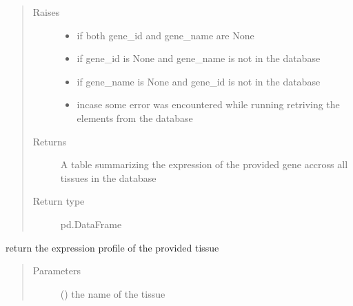 \documentclass[letterpaper,10pt,english]{sphinxmanual}
\begin{document}
\begin{fulllineitems}
\begin{fulllineitems}
\begin{quote}
\begin{description}
\begin{itemize}
\end{itemize}

\item[{Raises}] \leavevmode\begin{itemize}
\item {} 
 \textendash{} if both gene\_id and gene\_name are None

\item {} 
 \textendash{} if gene\_id is None and gene\_name is not in the database

\item {} 
 \textendash{} if gene\_name is None and gene\_id is not in the database

\item {} 
 \textendash{} incase some error was encountered while running retriving the elements from the database

\end{itemize}

\item[{Returns}] \leavevmode
A table summarizing the expression of the provided gene accross all tissues in the database

\item[{Return type}] \leavevmode
pd.DataFrame

\end{description}\end{quote}

\end{fulllineitems}


\begin{fulllineitems}
\label{\detokenize{IPTK.Classes:IPTK.Classes.Database.GeneExpressionDB.get_expression_in_tissue}}
return the expression profile of the provided tissue
\begin{quote}\begin{description}
\item[{Parameters}] \leavevmode
{} () \textendash{} the name of the tissue


\end{description}
\end{quote}
\end{fulllineitems}
\end{fulllineitems}
\end{document}
